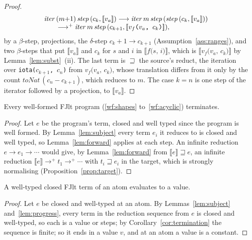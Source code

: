 \begin{proof}
\[ \begin{array}{@{}l@{}}
\mathit{iter}\,(m{+}1)\,\mathit{step}\,(c_k, \llbracket v_a \rrbracket) \longrightarrow \mathit{iter}\,m\,\mathit{step}\,(\mathit{step}\,(c_k, \llbracket v_a \rrbracket)) \\
\qquad \longrightarrow^{+} \mathit{iter}\,m\,\mathit{step}\,(c_{k+1}, \llbracket v_f\texttt{(}v_a\texttt{, }c_k\texttt{)} \rrbracket),
\end{array} \]
by a $\beta$-step, projections, the $\delta$-step $c_k + 1 \longrightarrow c_{k+1}$ (Assumption~\ref{ass:ranges}), and two $\beta$-steps that put $\llbracket v_a \rrbracket$ and $c_k$ for $s$ and $i$ in $\llbracket f\texttt{(}s\texttt{, }i\texttt{)} \rrbracket$, which is $\llbracket v_f\texttt{(}v_a\texttt{, }c_k\texttt{)} \rrbracket$ by Lemma~\ref{lem:subst}~(ii).
The last term is $\sqsupseteq$ the source's reduct, the iteration over \texttt{iota(}$c_{k+1}$\texttt{, }$c_n$\texttt{)} from $v_f\texttt{(}v_a\texttt{, }c_k\texttt{)}$, whose translation differs from it only by the count $\mathit{toNat}\,(c_n - c_{k+1})$, which reduces to $m$.
The case $k = n$ is one step of the iterator followed by a projection, to $\llbracket v_a \rrbracket$.
\end{proof}

\begin{corollary}[Termination]
\label{cor:termination}
Every well-formed FJlt program (\ref{wf:shapes} to~\ref{wf:acyclic}) terminates.
\end{corollary}
\begin{proof}
Let $e$ be the program's term, closed and well typed since the program is well formed.
By Lemma~\ref{lem:subject} every term $e_i$ it reduces to is closed and well typed, so Lemma~\ref{lem:forward} applies at each step.
An infinite reduction $e \longrightarrow e_1 \longrightarrow \cdots$ would give, by Lemma~\ref{lem:forward} from $\llbracket e \rrbracket \sqsupseteq e$, an infinite reduction $\llbracket e \rrbracket \longrightarrow^{+} t_1 \longrightarrow^{+} \cdots$ with $t_i \sqsupseteq e_i$ in the target, which is strongly normalising (Proposition~\ref{prop:target}).
\end{proof}

\begin{corollary}
\label{cor:soundness}
A well-typed closed FJlt term of an atom evaluates to a value.
\end{corollary}
\begin{proof}
Let $e$ be closed and well-typed at an atom.
By Lemmas~\ref{lem:subject} and~\ref{lem:progress}, every term in the reduction sequence from $e$ is closed and well-typed, so each is a value or steps; by Corollary~\ref{cor:termination} the sequence is finite; so it ends in a value $v$, and at an atom a value is a constant.
\end{proof}

